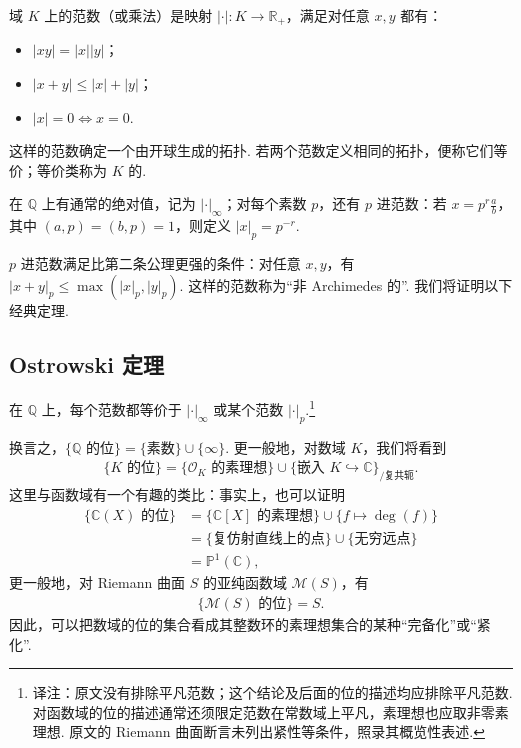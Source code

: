 域 $K$ 上的范数（或乘法）是映射 $|\cdot|\colon K\longrightarrow\mathbb{R}_+$，满足对任意 $x,y$ 都有：

\begin{itemize}

\item $|xy|=|x||y|$；

\item $|x+y|\leqslant|x|+|y|$；

\item $|x|=0\Longleftrightarrow x=0$.

\end{itemize}

这样的范数确定一个由开球生成的拓扑. 若两个范数定义相同的拓扑，便称它们等价；等价类称为 $K$ 的.

\begin{example*}

在 $\mathbb{Q}$ 上有通常的绝对值，记为 $|\cdot|_\infty$；对每个素数 $p$，还有 $p$ 进范数：若 $x=p^r\frac ab$，其中 $(a,p)=(b,p)=1$，则定义 $|x|_p=p^{-r}$.

\end{example*}

$p$ 进范数满足比第二条公理更强的条件：对任意 $x,y$，有 $|x+y|_p\leqslant\max(|x|_p,|y|_p)$. 这样的范数称为``非 Archimedes 的''. 我们将证明以下经典定理.

\subsection{Ostrowski 定理}\label{sec:nt-1-3-1}

\begin{theorem*}[Ostrowski]

在 $\mathbb{Q}$ 上，每个范数都等价于 $|\cdot|_\infty$ 或某个范数 $|\cdot|_p$.\footnote{译注：原文没有排除平凡范数；这个结论及后面的位的描述均应排除平凡范数. 对函数域的位的描述通常还须限定范数在常数域上平凡，素理想也应取非零素理想. 原文的 Riemann 曲面断言未列出紧性等条件，照录其概览性表述.}

\end{theorem*}

换言之，$\{\mathbb{Q}\text{ 的位}\}=\{\text{素数}\}\cup\{\infty\}$. 更一般地，对数域 $K$，我们将看到
\begin{align*}
\{K\text{ 的位}\}=\{\mathcal O_K\text{ 的素理想}\}\cup\{\text{嵌入 }K\hookrightarrow\mathbb{C}\}_{/\text{复共轭}}.
\end{align*}
这里与函数域有一个有趣的类比：事实上，也可以证明
\begin{align*}
\{\mathbb{C}(X)\text{ 的位}\}&=\{\mathbb{C}[X]\text{ 的素理想}\}\cup\{f\mapsto\deg(f)\}\\
&=\{\text{复仿射直线上的点}\}\cup\{\text{无穷远点}\}\\
&=\mathbb{P}^1(\mathbb{C}),
\end{align*}
更一般地，对 Riemann 曲面 $S$ 的亚纯函数域 $\mathcal M(S)$，有
\begin{align*}
\{\mathcal M(S)\text{ 的位}\}=S.
\end{align*}
因此，可以把数域的位的集合看成其整数环的素理想集合的某种``完备化''或``紧化''.

